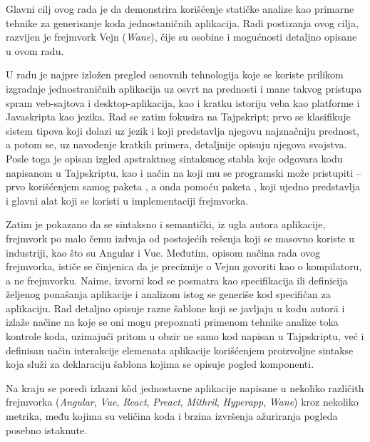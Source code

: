 Glavni cilj ovog rada je da demonstrira korišćenje statičke analize kao primarne tehnike za generisanje koda jednostaničnih aplikacija.
Radi postizanja ovog cilja, razvijen je frejmvork Vejn (\textsl{Wane}), čije su osobine i mogućnosti detaljno opisane u ovom radu.

U radu je najpre izložen pregled osnovnih tehnologija koje se koriste prilikom izgradnje jednostraničnih aplikacija uz osvrt na prednosti i mane takvog pristupa spram veb-sajtova i desktop-aplikacija, kao i kratku istoriju veba kao platforme i Javaskripta kao jezika.
Rad se zatim fokusira na Tajpskript; prvo se klasifikuje sistem tipova koji dolazi uz jezik i koji predstavlja njegovu najznačniju prednost, a potom se, uz navođenje kratkih primera, detaljnije opisuju njegova svojstva.
Posle toga je opisan izgled apstraktnog sintaksnog stabla koje odgovara kodu napisanom u Tajpskriptu, kao i način na koji mu se programski može pristupiti -- prvo korišćenjem samog paketa , a onda pomoću paketa , koji ujedno predstavlja i glavni alat koji se koristi u implementaciji frejmvorka.

Zatim je pokazano da se sintaksno i semantički, iz ugla autora aplikacije, frejmvork po malo čemu izdvaja od postojećih rešenja koji se masovno koriste u industriji, kao što su Angular i Vue.
Međutim, opisom načina rada ovog frejmvorka, ističe se činjenica da je preciznije o Vejnu govoriti kao o kompilatoru, a ne frejmvorku.
Naime, izvorni kod se posmatra kao specifikacija ili definicija željenog ponašanja aplikacije i analizom istog se generiše kod specifičan za aplikaciju.
Rad detaljno opisuje razne šablone koji se javljaju u kodu autor\=a i izlaže načine na koje se oni mogu prepoznati primenom tehnike analize toka kontrole koda, uzimajući pritom u obzir ne samo kod napisan u Tajpskriptu, već i definisan način interakcije elemenata aplikacije korišćenjem proizvoljne sintakse koja služi za deklaraciju šablona kojima se opisuje pogled komponenti.

Na kraju se poredi izlazni kôd jednostavne  aplikacije napisane u nekoliko različith frejmvorka (\textsl{Angular}, \textsl{Vue}, \textsl{React}, \textsl{Preact}, \textsl{Mithril}, \textsl{Hyperapp}, \textsl{Wane}) kroz nekoliko metrika, među kojima su veličina koda i brzina izvršenja ažuriranja pogleda posebno istaknute.
